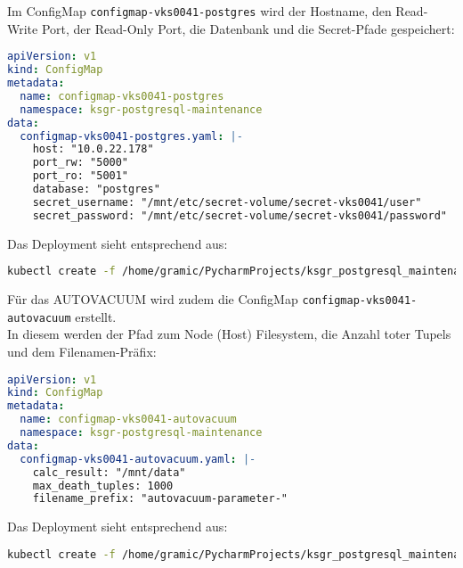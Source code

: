 \begin{flushleft}
    Im ConfigMap \texttt{configmap-vks0041-postgres} wird der Hostname, den Read-Write Port, der Read-Only Port, die Datenbank und die Secret-Pfade gespeichert:
    \lstset{style=gra_codestyle}
    \begin{lstlisting}[language=yaml, caption=Maintenance-Tool - \Gls{AUTOVACUUM} - configmap-vks0041-postgres,captionpos=b,label={lst:maintenannce-tool-autovacuum-configmap-vks0041-postgres},breaklines=true]
apiVersion: v1
kind: ConfigMap
metadata:
  name: configmap-vks0041-postgres
  namespace: ksgr-postgresql-maintenance
data:
  configmap-vks0041-postgres.yaml: |-
    host: "10.0.22.178"
    port_rw: "5000"
    port_ro: "5001"
    database: "postgres"
    secret_username: "/mnt/etc/secret-volume/secret-vks0041/user"
    secret_password: "/mnt/etc/secret-volume/secret-vks0041/password"
    \end{lstlisting}
    Das Deployment sieht entsprechend aus:
    \lstset{style=gra_codestyle}
    \begin{lstlisting}[language=bash, caption=Maintenance-Tool - \Gls{AUTOVACUUM} - configmap-vks0041-postgres Deploy,captionpos=b,label={lst:maintenannce-tool-configmap-vks0041-postgres-deploy},breaklines=true]
kubectl create -f /home/gramic/PycharmProjects/ksgr_postgresql_maintenance/configmap-vks0041-postgres.yaml
    \end{lstlisting}
    Für das \Gls{AUTOVACUUM} wird zudem die ConfigMap \texttt{configmap-vks0041-autovacuum} erstellt.\\
    In diesem werden der Pfad zum Node (Host) Filesystem, die Anzahl toter Tupels und dem Filenamen-Präfix:
    \lstset{style=gra_codestyle}
    \begin{lstlisting}[language=yaml, caption=Maintenance-Tool - \Gls{AUTOVACUUM} - configmap-vks0041-autovacuum,captionpos=b,label={lst:maintenannce-tool-autovacuum-configmap-vks0041-autovacuum},breaklines=true]
apiVersion: v1
kind: ConfigMap
metadata:
  name: configmap-vks0041-autovacuum
  namespace: ksgr-postgresql-maintenance
data:
  configmap-vks0041-autovacuum.yaml: |-
    calc_result: "/mnt/data"
    max_death_tuples: 1000
    filename_prefix: "autovacuum-parameter-"
    \end{lstlisting}
    Das Deployment sieht entsprechend aus:
    \lstset{style=gra_codestyle}
    \begin{lstlisting}[language=bash, caption=Maintenance-Tool - \Gls{AUTOVACUUM} - configmap-vks0041-autovacuum Deploy,captionpos=b,label={lst:maintenannce-tool-configmap-vks0041-autovacuum-deploy},breaklines=true]
kubectl create -f /home/gramic/PycharmProjects/ksgr_postgresql_maintenance/configmap-vks0041-autovacuum.yaml
    \end{lstlisting}
\end{flushleft}
